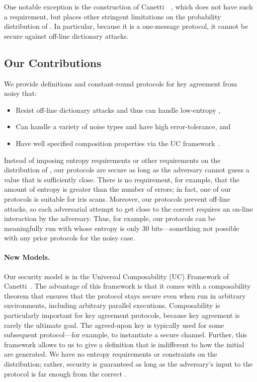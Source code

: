 One notable exception is the construction of Canetti~\etal~\cite{EC:CFPRS16}, which does not have such a requirement, but places other stringent limitations on the probability distribution of \passwords.
In particular, because it is a one-message protocol, it cannot be secure against off-line dictionary attacks.

\subsection{Our Contributions}
We provide definitions and constant-round protocols for key agreement from noisy \passwords that:
\begin{itemize}
\item Resist off-line dictionary attacks and thus can handle low-entropy \passwords,
\item Can handle a variety of noise types and have high error-tolerance, and
\item Have well specified composition properties via the UC framework~\cite{FOCS:Canetti01}.
\end{itemize}

Instead of imposing entropy requirements or other requirements on the distribution of \passwords, our protocols are secure as long as the adversary cannot guess a \password value that is sufficiently close. 
There is no requirement, for example, that the amount of \password entropy is greater than the number of errors; in fact, one of our protocols is suitable for iris scans.
Moreover, our protocols prevent off-line attacks, so each adversarial attempt to get close to the correct \password requires an on-line interaction by the adversary. 
Thus, for example, our protocols can be meaningfully run with \passwords whose entropy is only 30 bits---something not possible with any prior protocols for the noisy case.

\paragraph{New Models.}
Our security model is in the Universal Composability (UC) Framework of Canetti~\cite{FOCS:Canetti01}. 
The advantage of this framework is that it comes with a composability theorem that ensures that the protocol stays secure even when run in arbitrary environments, including arbitrary parallel executions. 
Composability is particularly important for key agreement protocols, because key agreement is rarely the ultimate goal.
The agreed-upon key is typically used for some subsequent protocol---for example, to instantiate a secure channel. 
Further, this framework allows to us to give a definition that is indifferent to how the initial \passwords are generated.
We have no entropy requirements or constraints on the \password distribution; rather, security is guaranteed as long as the adversary's input to the protocol is far enough from the correct \password.

